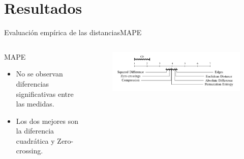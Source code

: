 \documentclass[12pt, aspectratio=169]{beamer} %
\begin{document}
\section{Resultados}

\begin{frame}{Evaluación empírica de las distancias}{MAPE}
  \begin{columns}
    \begin{column}{0.6\textwidth}
      \begin{block}{MAPE}
        \begin{itemize}
        \item No se observan diferencias significativas entre las medidas.
        \item Los dos mejores son la diferencia cuadrática y Zero-crossing.
          \end{itemize}
      \end{block}
    \end{column}
    \begin{column}{0.4\textwidth}
      \begin{figure}
        \includegraphics[width=\textwidth]{20210313_4_nemenyi_distancias_cd.png}
      \end{figure}
    \end{column}
  \end{columns}
\end{frame}
\end{document}

